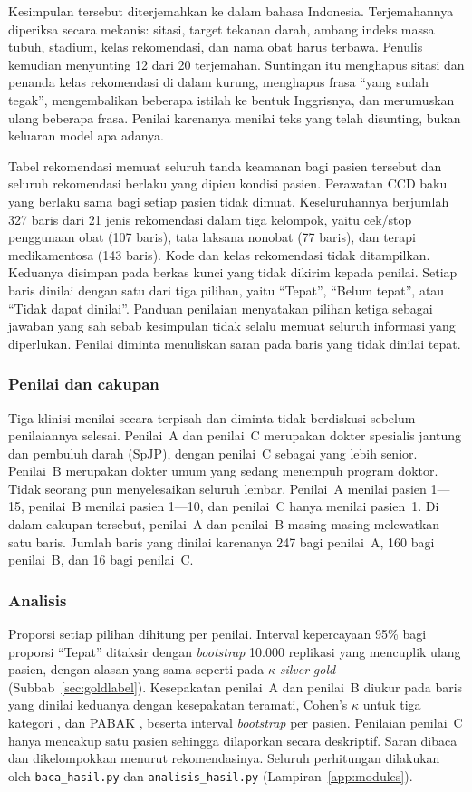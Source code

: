 Kesimpulan tersebut diterjemahkan ke dalam bahasa Indonesia. Terjemahannya diperiksa secara
mekanis: sitasi, target tekanan darah, ambang indeks massa tubuh, stadium, kelas rekomendasi,
dan nama obat harus terbawa. Penulis kemudian menyunting 12 dari 20 terjemahan. Suntingan itu
menghapus sitasi dan penanda kelas rekomendasi di dalam kurung, menghapus frasa ``yang sudah
tegak'', mengembalikan beberapa istilah ke bentuk Inggrisnya, dan merumuskan ulang beberapa
frasa. Penilai karenanya menilai teks yang telah disunting, bukan keluaran model apa adanya.

Tabel rekomendasi memuat seluruh tanda keamanan bagi pasien tersebut dan seluruh rekomendasi
berlaku yang dipicu kondisi pasien. Perawatan CCD baku yang berlaku sama bagi setiap pasien
tidak dimuat. Keseluruhannya berjumlah 327 baris dari 21 jenis rekomendasi dalam tiga
kelompok, yaitu cek/stop penggunaan obat (107 baris), tata laksana nonobat (77 baris), dan terapi
medikamentosa (143 baris). Kode dan kelas rekomendasi tidak ditampilkan. Keduanya disimpan
pada berkas kunci yang tidak dikirim kepada penilai. Setiap baris dinilai dengan satu dari tiga
pilihan, yaitu ``Tepat'', ``Belum tepat'', atau ``Tidak dapat dinilai''. Panduan penilaian
menyatakan pilihan ketiga sebagai jawaban yang sah sebab kesimpulan tidak selalu memuat
seluruh informasi yang diperlukan. Penilai diminta menuliskan saran pada baris yang tidak
dinilai tepat.

\subsubsection*{Penilai dan cakupan}
Tiga klinisi menilai secara terpisah dan diminta tidak berdiskusi sebelum penilaiannya
selesai.
Penilai~A dan penilai~C merupakan dokter spesialis jantung dan pembuluh darah (SpJP), dengan
penilai~C sebagai yang lebih senior. Penilai~B merupakan dokter umum yang sedang menempuh
program doktor. Tidak seorang pun menyelesaikan seluruh lembar. Penilai~A menilai pasien
1---15, penilai~B menilai pasien 1---10, dan penilai~C hanya menilai pasien~1. Di dalam
cakupan tersebut, penilai~A dan penilai~B masing-masing melewatkan satu baris. Jumlah baris
yang dinilai karenanya 247 bagi penilai~A, 160 bagi penilai~B, dan 16 bagi penilai~C.

\subsubsection*{Analisis}
Proporsi setiap pilihan dihitung per penilai. Interval kepercayaan 95\% bagi proporsi
``Tepat'' ditaksir dengan \emph{bootstrap} 10.000 replikasi yang mencuplik ulang pasien,
dengan alasan yang sama seperti pada $\kappa$ \emph{silver}-\emph{gold}
(Subbab~\ref{sec:goldlabel}). Kesepakatan penilai~A dan penilai~B diukur pada baris yang
dinilai keduanya dengan kesepakatan teramati, Cohen's $\kappa$ untuk tiga kategori
\cite{cohen1960}, dan PABAK \cite{byrt1993}, beserta interval \emph{bootstrap} per pasien.
Penilaian penilai~C hanya mencakup satu pasien sehingga dilaporkan secara deskriptif. Saran
dibaca dan dikelompokkan menurut rekomendasinya. Seluruh perhitungan dilakukan oleh
\texttt{baca\_hasil.py} dan \texttt{analisis\_hasil.py} (Lampiran~\ref{app:modules}).


